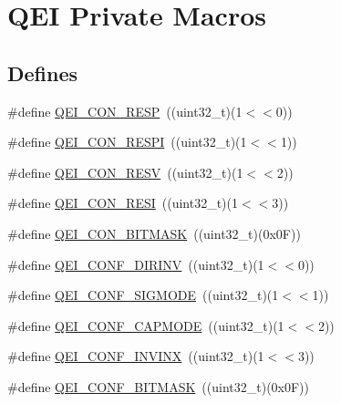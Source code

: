 \hypertarget{group___q_e_i___private___macros}{\section{\-Q\-E\-I \-Private \-Macros}
\label{group___q_e_i___private___macros}
}
\subsection*{\-Defines}
\begin{DoxyCompactItemize}
\item 
\#define \hyperlink{group___q_e_i___private___macros_gadab2ce38aa6d4b60258d5db13982e55c}{\-Q\-E\-I\-\_\-\-C\-O\-N\-\_\-\-R\-E\-S\-P}~((uint32\-\_\-t)(1$<$$<$0))
\item 
\#define \hyperlink{group___q_e_i___private___macros_ga4d0c708b17d41cf80d5ea34777c1858f}{\-Q\-E\-I\-\_\-\-C\-O\-N\-\_\-\-R\-E\-S\-P\-I}~((uint32\-\_\-t)(1$<$$<$1))
\item 
\#define \hyperlink{group___q_e_i___private___macros_ga9f1eae1d8a4ba39f3197fdb69bcedc17}{\-Q\-E\-I\-\_\-\-C\-O\-N\-\_\-\-R\-E\-S\-V}~((uint32\-\_\-t)(1$<$$<$2))
\item 
\#define \hyperlink{group___q_e_i___private___macros_ga76aa5b26274777d9606d79c697511c61}{\-Q\-E\-I\-\_\-\-C\-O\-N\-\_\-\-R\-E\-S\-I}~((uint32\-\_\-t)(1$<$$<$3))
\item 
\#define \hyperlink{group___q_e_i___private___macros_gae25612fdeef077bd8154ace30b9b2091}{\-Q\-E\-I\-\_\-\-C\-O\-N\-\_\-\-B\-I\-T\-M\-A\-S\-K}~((uint32\-\_\-t)(0x0\-F))
\item 
\#define \hyperlink{group___q_e_i___private___macros_ga616a23b4f2453b4934c19f162d7c8fba}{\-Q\-E\-I\-\_\-\-C\-O\-N\-F\-\_\-\-D\-I\-R\-I\-N\-V}~((uint32\-\_\-t)(1$<$$<$0))
\item 
\#define \hyperlink{group___q_e_i___private___macros_ga6234063e1c9d7a5e6fbc0fa294fe1c5f}{\-Q\-E\-I\-\_\-\-C\-O\-N\-F\-\_\-\-S\-I\-G\-M\-O\-D\-E}~((uint32\-\_\-t)(1$<$$<$1))
\item 
\#define \hyperlink{group___q_e_i___private___macros_gae5d377ec1ce7e14b0c74cca1cbb0f758}{\-Q\-E\-I\-\_\-\-C\-O\-N\-F\-\_\-\-C\-A\-P\-M\-O\-D\-E}~((uint32\-\_\-t)(1$<$$<$2))
\item 
\#define \hyperlink{group___q_e_i___private___macros_ga1e8ac3c6d37ff0b361f1353f037789f3}{\-Q\-E\-I\-\_\-\-C\-O\-N\-F\-\_\-\-I\-N\-V\-I\-N\-X}~((uint32\-\_\-t)(1$<$$<$3))
\item 
\#define \hyperlink{group___q_e_i___private___macros_ga8bd2265caeb1f3e231f7767a4ba274f2}{\-Q\-E\-I\-\_\-\-C\-O\-N\-F\-\_\-\-B\-I\-T\-M\-A\-S\-K}~((uint32\-\_\-t)(0x0\-F))

\end{DoxyCompactItemize}
